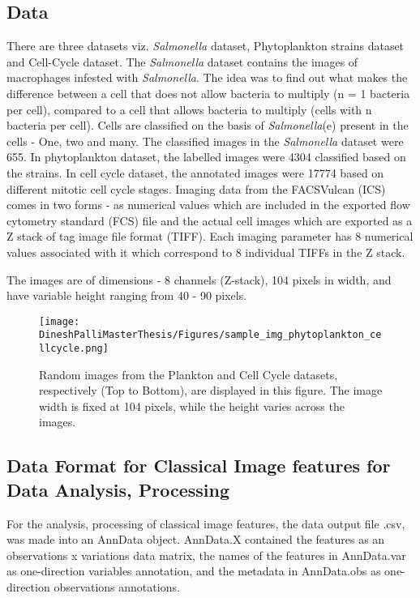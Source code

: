 \documentclass[12pt,a4paper]{article}
\begin{document}
\subsection{Data}
There are three datasets viz. \textit{Salmonella} dataset, Phytoplankton strains dataset and Cell-Cycle dataset. The \textit{Salmonella} dataset contains the images of macrophages infested with \textit{Salmonella}. The idea was to find out what makes the difference between a cell that does not allow bacteria to multiply (n = 1 bacteria per cell), compared to a cell that allows bacteria to multiply (cells with n  bacteria per cell). Cells are classified on the basis of \textit{Salmonella}(e) present in the cells - One, two and many. The classified images in the \textit{Salmonella} dataset were 655. In phytoplankton dataset, the labelled images were 4304 classified based on the strains. In cell cycle dataset, the annotated images were 17774 based on different mitotic cell cycle stages. Imaging data from the FACSVulcan (ICS) comes in two forms - as numerical values which are included in the exported flow cytometry standard (FCS) file and the actual cell images which are exported as a Z stack of tag image file format (TIFF). Each imaging parameter has 8 numerical values associated with it which correspond to 8 individual TIFFs in the Z stack.

The images are of dimensions - 8 channels (Z-stack), 104 pixels in width, and have variable height ranging from 40 - 90 pixels.

\begin{figure}
  \centering
  \texttt{[image: DineshPalliMasterThesis/Figures/sample\_img\_phytoplankton\_cellcycle.png]}
  \caption{Random images from the Plankton and Cell Cycle datasets, respectively (Top to Bottom), are displayed in this figure. The image width is fixed at 104 pixels, while the height varies across the images.}
  \label{sampleimgs}
\end{figure}

\subsection{Data Format for Classical Image features for Data Analysis, Processing}
\label{adata_scanpy}
For the analysis, processing of classical image features, the data output file .csv, was made into an AnnData object. AnnData.X contained the features as an observations x variations data matrix, the names of the features in AnnData.var as one-direction variables annotation, and the metadata in AnnData.obs as one-direction observations annotations.
\end{document}
